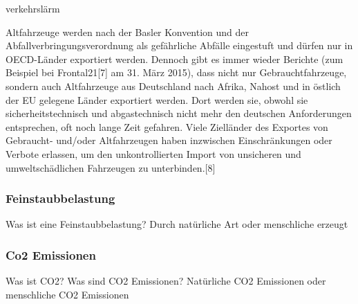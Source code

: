 verkehrslärm


Altfahrzeuge werden nach der Basler Konvention und der Abfallverbringungsverordnung als gefährliche Abfälle eingestuft und dürfen nur in OECD-Länder exportiert werden. Dennoch gibt es immer wieder Berichte (zum Beispiel bei Frontal21[7] am 31. März 2015), dass nicht nur Gebrauchtfahrzeuge, sondern auch Altfahrzeuge aus Deutschland nach Afrika, Nahost und in östlich der EU gelegene Länder exportiert werden. Dort werden sie, obwohl sie sicherheitstechnisch und abgastechnisch nicht mehr den deutschen Anforderungen entsprechen, oft noch lange Zeit gefahren. Viele Zielländer des Exportes von Gebraucht- und/oder Altfahrzeugen haben inzwischen Einschränkungen oder Verbote erlassen, um den unkontrollierten Import von unsicheren und umweltschädlichen Fahrzeugen zu unterbinden.[8]


\subsubsection{Feinstaubbelastung}
Was ist eine Feinstaubbelastung?
Durch natürliche Art oder menschliche erzeugt
\subsubsection{Co2 Emissionen}
Was ist \ac{CO2}?
Was sind CO2 Emissionen?
Natürliche CO2 Emissionen oder menschliche CO2 Emissionen
